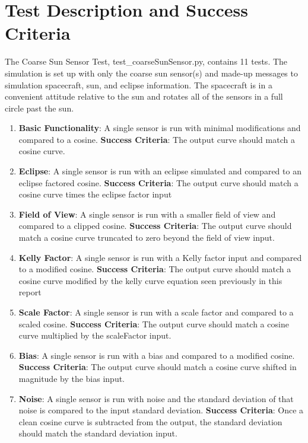
\section{Test Description and Success Criteria}
The Coarse Sun Sensor Test, test\_coarseSunSensor.py, contains 11 tests. The simulation is set up with only the coarse sun sensor(s) and made-up messages to simulation spacecraft, sun, and eclipse information. The spacecraft is in a convenient attitude relative to the sun and rotates all of the sensors in a full circle past the sun.
\begin{enumerate}
	\item\textbf{Basic Functionality}: A single sensor is run with minimal modifications and compared to a cosine.
	\subitem \textbf{Success Criteria}: The output curve should match a cosine curve.
	\item\textbf{Eclipse}: A single sensor is run with an eclipse simulated and compared to an eclipse factored cosine.
	\subitem \textbf{Success Criteria}: The output curve should match a cosine curve times the eclipse factor input
	\item\textbf{Field of View}: A single sensor is run with a smaller field of view and compared to a clipped cosine.
	\subitem \textbf{Success Criteria}: The output curve should match a cosine curve truncated to zero beyond the field of view input.
	\item\textbf{Kelly Factor}: A single sensor is run with a Kelly factor input and compared to a modified cosine.
	\subitem \textbf{Success Criteria}: The output curve should match a cosine curve modified by the kelly curve equation seen previously in this report
	\item\textbf{Scale Factor}: A single sensor is run with a scale factor and compared to a scaled cosine.
	\subitem \textbf{Success Criteria}: The output curve should match a cosine curve multiplied by the scaleFactor input.
	\item\textbf{Bias}: A single sensor is run with a bias and compared to a modified cosine.
	\subitem \textbf{Success Criteria}: The output curve should match a cosine curve shifted in magnitude by the bias input.
	\item\textbf{Noise}: A single sensor is run with noise and the standard deviation of that noise is compared to the input standard deviation.
	\subitem \textbf{Success Criteria}: Once a clean cosine curve is subtracted from the output, the standard deviation should match the standard deviation input.

\end{enumerate}
